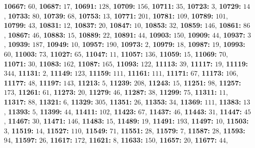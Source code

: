\textsf{\bfseries 10667:} $60$, \textsf{\bfseries 10687:} $17$, \textsf{\bfseries 10691:} $128$, \textsf{\bfseries 10709:} $156$, \textsf{\bfseries 10711:} $35$, \textsf{\bfseries 10723:} $3$, \textsf{\bfseries 10729:} $14$, \textsf{\bfseries 10733:} $80$, \textsf{\bfseries 10739:} $68$, \textsf{\bfseries 10753:} $13$, \textsf{\bfseries 10771:} $201$, \textsf{\bfseries 10781:} $109$, \textsf{\bfseries 10789:} $101$, \textsf{\bfseries 10799:} $43$, \textsf{\bfseries 10831:} $12$, \textsf{\bfseries 10837:} $20$, \textsf{\bfseries 10847:} $10$, \textsf{\bfseries 10853:} $32$, \textsf{\bfseries 10859:} $146$, \textsf{\bfseries 10861:} $86$, \textsf{\bfseries 10867:} $46$, \textsf{\bfseries 10883:} $15$, \textsf{\bfseries 10889:} $22$, \textsf{\bfseries 10891:} $44$, \textsf{\bfseries 10903:} $150$, \textsf{\bfseries 10909:} $44$, \textsf{\bfseries 10937:} $3$, \textsf{\bfseries 10939:} $187$, \textsf{\bfseries 10949:} $10$, \textsf{\bfseries 10957:} $190$, \textsf{\bfseries 10973:} $2$, \textsf{\bfseries 10979:} $18$, \textsf{\bfseries 10987:} $19$, \textsf{\bfseries 10993:} $60$, \textsf{\bfseries 11003:} $73$, \textsf{\bfseries 11027:} $65$, \textsf{\bfseries 11047:} $11$, \textsf{\bfseries 11057:} $136$, \textsf{\bfseries 11059:} $15$, \textsf{\bfseries 11069:} $70$, \textsf{\bfseries 11071:} $30$, \textsf{\bfseries 11083:} $162$, \textsf{\bfseries 11087:} $165$, \textsf{\bfseries 11093:} $122$, \textsf{\bfseries 11113:} $39$, \textsf{\bfseries 11117:} $19$, \textsf{\bfseries 11119:} $344$, \textsf{\bfseries 11131:} $2$, \textsf{\bfseries 11149:} $123$, \textsf{\bfseries 11159:} $111$, \textsf{\bfseries 11161:} $111$, \textsf{\bfseries 11171:} $67$, \textsf{\bfseries 11173:} $106$, \textsf{\bfseries 11177:} $48$, \textsf{\bfseries 11197:} $143$, \textsf{\bfseries 11213:} $5$, \textsf{\bfseries 11239:} $208$, \textsf{\bfseries 11243:} $15$, \textsf{\bfseries 11251:} $98$, \textsf{\bfseries 11257:} $173$, \textsf{\bfseries 11261:} $61$, \textsf{\bfseries 11273:} $20$, \textsf{\bfseries 11279:} $46$, \textsf{\bfseries 11287:} $38$, \textsf{\bfseries 11299:} $75$, \textsf{\bfseries 11311:} $11$, \textsf{\bfseries 11317:} $88$, \textsf{\bfseries 11321:} $6$, \textsf{\bfseries 11329:} $305$, \textsf{\bfseries 11351:} $26$, \textsf{\bfseries 11353:} $34$, \textsf{\bfseries 11369:} $111$, \textsf{\bfseries 11383:} $13$, \textsf{\bfseries 11393:} $5$, \textsf{\bfseries 11399:} $44$, \textsf{\bfseries 11411:} $102$, \textsf{\bfseries 11423:} $67$, \textsf{\bfseries 11437:} $46$, \textsf{\bfseries 11443:} $31$, \textsf{\bfseries 11447:} $45$, \textsf{\bfseries 11467:} $30$, \textsf{\bfseries 11471:} $146$, \textsf{\bfseries 11483:} $15$, \textsf{\bfseries 11489:} $19$, \textsf{\bfseries 11491:} $193$, \textsf{\bfseries 11497:} $10$, \textsf{\bfseries 11503:} $3$, \textsf{\bfseries 11519:} $14$, \textsf{\bfseries 11527:} $110$, \textsf{\bfseries 11549:} $71$, \textsf{\bfseries 11551:} $28$, \textsf{\bfseries 11579:} $7$, \textsf{\bfseries 11587:} $28$, \textsf{\bfseries 11593:} $94$, \textsf{\bfseries 11597:} $26$, \textsf{\bfseries 11617:} $172$, \textsf{\bfseries 11621:} $8$, \textsf{\bfseries 11633:} $150$, \textsf{\bfseries 11657:} $20$, \textsf{\bfseries 11677:} $44$, 
